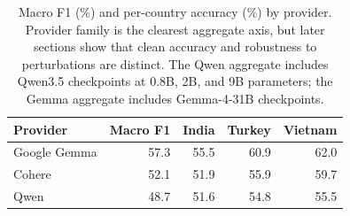 \begin{table}[t]
\caption{Macro F1 (\%) and per-country accuracy (\%) by provider. Provider family is the clearest aggregate axis, but later sections show that clean accuracy and robustness to perturbations are distinct. The Qwen aggregate includes Qwen3.5 checkpoints at 0.8B, 2B, and 9B parameters; the Gemma aggregate includes Gemma-4-31B checkpoints.}
\centering
\footnotesize
\setlength{\tabcolsep}{5pt}
\begin{tabular}{lrrrr}
\toprule
Provider & Macro F1 & India & Turkey & Vietnam \\
\midrule
Google Gemma & 57.3 & 55.5 & 60.9 & 62.0 \\
Cohere & 52.1 & 51.9 & 55.9 & 59.7 \\
Qwen & 48.7 & 51.6 & 54.8 & 55.5 \\
\bottomrule
\end{tabular}
\label{tab:provider}
\end{table}
